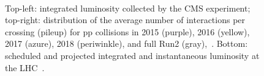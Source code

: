 \begin{figure}[h]
  \noindent
  \\
  \caption{Top-left: integrated luminosity collected by the CMS
    experiment; top-right: distribution of the average number of
    interactions per crossing (pileup) for pp collisions in 2015
    (purple), 2016 (yellow), 2017 (azure), 2018 (periwinkle), and
    full Run2 (gray),~\cite{webpage_lumi}. Bottom: scheduled and
    projected integrated and instantaneous luminosity at the LHC~\cite{webpage_lhc}.}
  \label{fig:lumi}
\end{figure}

